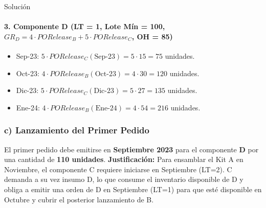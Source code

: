 \documentclass[11pt, a4paper]{article}
\begin{document}
\begin{ejercicio}{Solución}
  \paragraph{3. Componente D (LT = 1, Lote Mín = 100, $GR_D = 4 \cdot PORelease_B + 5 \cdot PORelease_C$, OH = 85)}
  \begin{itemize}
    \item Sep-23: $5 \cdot PORelease_C(\text{Sep-23}) = 5 \cdot 15 = 75$ unidades.
    \item Oct-23: $4 \cdot PORelease_B(\text{Oct-23}) = 4 \cdot 30 = 120$ unidades.
    \item Dic-23: $5 \cdot PORelease_C(\text{Dic-23}) = 5 \cdot 27 = 135$ unidades.
    \item Ene-24: $4 \cdot PORelease_B(\text{Ene-24}) = 4 \cdot 54 = 216$ unidades.
  \end{itemize}
  \begin{center}
  \end{center}

  \subsubsection*{c) Lanzamiento del Primer Pedido}
  El primer pedido debe emitirse en \textbf{Septiembre 2023} para el componente \textbf{D} por una cantidad de \textbf{110 unidades}.
  \textbf{Justificación:} Para ensamblar el Kit A en Noviembre, el componente C requiere iniciarse en Septiembre (LT=2). C demanda a su vez insumo D, lo que consume el inventario disponible de D y obliga a emitir una orden de D en Septiembre (LT=1) para que esté disponible en Octubre y cubrir el posterior lanzamiento de B.

\end{ejercicio}

\newpage
\end{document}
